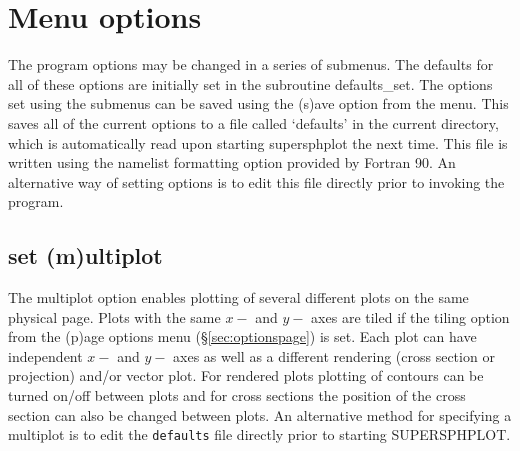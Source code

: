 \documentclass[a4paper,11pt]{article}
\begin{document}
\section{Menu options}
 The program options may be changed in a series of submenus. The defaults for all of
these options are initially set in the subroutine defaults\_set. The options set using
the submenus can be saved using the (s)ave option from the menu. This saves all of
the current options to a file called `defaults' in the current directory, which is
automatically read upon starting supersphplot the next time. This file is written using
the namelist formatting option provided by Fortran 90. An alternative way of setting
options is to edit this file directly prior to invoking the program.

\subsection{set (m)ultiplot}
 The multiplot option enables plotting of several different plots on the same
physical page. Plots with the same $x-$ and $y-$ axes are tiled if the tiling
option from the (p)age options menu (\S\vref{sec:optionspage}) is set. Each plot
can have independent $x-$ and $y-$ axes as well as a different rendering (cross
section or projection) and/or vector plot. For rendered plots plotting of
contours can be turned on/off between plots and for cross sections the position of
the cross section can also be changed between plots. An alternative method for
specifying a multiplot is to edit the \verb+defaults+ file directly prior to
starting SUPERSPHPLOT.
\end{document}

